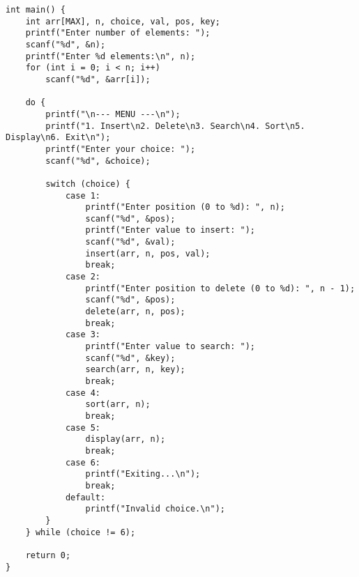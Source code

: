 \documentclass[12pt,a4paper]{article}
\begin{document}
\begin{lstlisting}
int main() {
    int arr[MAX], n, choice, val, pos, key;
    printf("Enter number of elements: ");
    scanf("%d", &n);
    printf("Enter %d elements:\n", n);
    for (int i = 0; i < n; i++)
        scanf("%d", &arr[i]);

    do {
        printf("\n--- MENU ---\n");
        printf("1. Insert\n2. Delete\n3. Search\n4. Sort\n5. Display\n6. Exit\n");
        printf("Enter your choice: ");
        scanf("%d", &choice);

        switch (choice) {
            case 1:
                printf("Enter position (0 to %d): ", n);
                scanf("%d", &pos);
                printf("Enter value to insert: ");
                scanf("%d", &val);
                insert(arr, n, pos, val);
                break;
            case 2:
                printf("Enter position to delete (0 to %d): ", n - 1);
                scanf("%d", &pos);
                delete(arr, n, pos);
                break;
            case 3:
                printf("Enter value to search: ");
                scanf("%d", &key);
                search(arr, n, key);
                break;
            case 4:
                sort(arr, n);
                break;
            case 5:
                display(arr, n);
                break;
            case 6:
                printf("Exiting...\n");
                break;
            default:
                printf("Invalid choice.\n");
        }
    } while (choice != 6);

    return 0;
}
\end{lstlisting}
\end{document}
